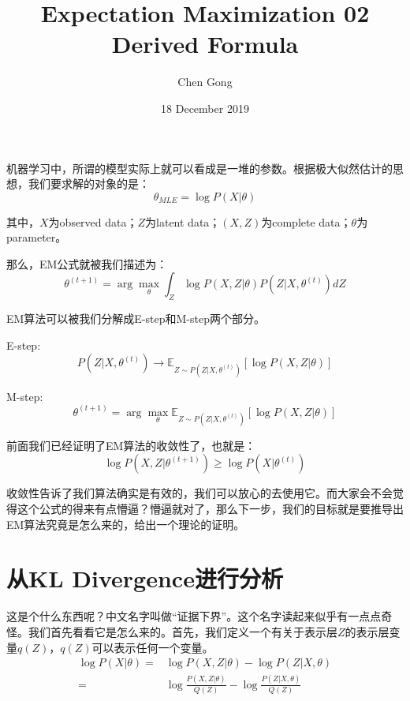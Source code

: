 \documentclass[a4paper]{article}
\title{Expectation Maximization 02 Derived Formula}
\author{Chen Gong}
\date{18 December 2019}
\begin{document}
\maketitle
机器学习中，所谓的模型实际上就可以看成是一堆的参数。根据极大似然估计的思想，我们要求解的对象的是：
\begin{equation}
    \theta_{MLE} = \log P(X|\theta)
\end{equation}

其中，$X$为observed data；$Z$为latent data；$(X,Z)$为complete data；$\theta$为parameter。

那么，EM公式就被我们描述为：
\begin{equation}
\theta^{(t+1)} = \arg\max_{\theta} \int_Z \log P(X,Z|\theta)P(Z|X,\theta^{(t)}) dZ    
\end{equation}

EM算法可以被我们分解成E-step和M-step两个部分。

E-step:
\begin{equation}
    P(Z|X,\theta^{(t)}) \longrightarrow \mathbb{E}_{Z\sim P(Z|X,\theta^{(t)})}\left[ \log P(X,Z|\theta) \right]
\end{equation}

M-step:
\begin{equation}
    \theta^{(t+1)} = \arg\max_{\theta} \mathbb{E}_{Z\sim P(Z|X,\theta^{(t)})}\left[ \log P(X,Z|\theta) \right]
\end{equation}

前面我们已经证明了EM算法的收敛性了，也就是：
\begin{equation}
    \log P(X,Z|\theta^{(t+1)}) \geq \log P(X|\theta^{(t)})
\end{equation}

收敛性告诉了我们算法确实是有效的，我们可以放心的去使用它。而大家会不会觉得这个公式的得来有点懵逼？懵逼就对了，那么下一步，我们的目标就是要推导出EM算法究竟是怎么来的，给出一个理论的证明。

\section{从KL Divergence进行分析}
这是个什么东西呢？中文名字叫做“证据下界”。这个名字读起来似乎有一点点奇怪。我们首先看看它是怎么来的。首先，我们定义一个有关于表示层$Z$的表示层变量$q(Z)$，$q(Z)$可以表示任何一个变量。
\begin{equation}
    \begin{split}
        \log P(X|\theta) 
        = & \log P(X,Z|\theta) - \log P(Z|X,\theta) \\
        = & \log \frac{P(X,Z|\theta)}{Q(Z)} - \log \frac{P(Z|X,\theta)}{Q(Z)} \\
    \end{split}
\end{equation}
\end{document}
